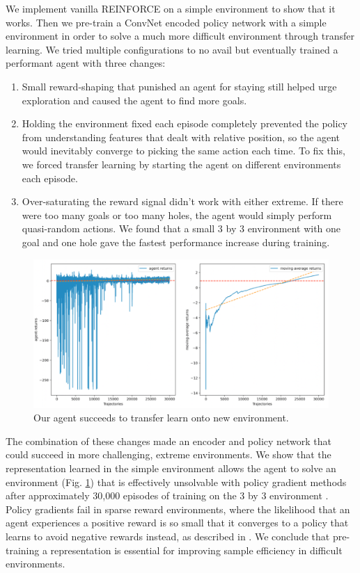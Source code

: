 \documentclass[11pt]{article}
\begin{document}
We implement vanilla REINFORCE on a simple environment to show that it works. Then we pre-train a ConvNet encoded policy network with a simple environment in order to solve a much more difficult environment through transfer learning. We tried multiple configurations to no avail but eventually trained a performant agent with three changes:
\begin{enumerate}
    \item Small reward-shaping that punished an agent for staying still helped urge exploration and caused the agent to find more goals. 
    \item Holding the environment fixed each episode completely prevented the policy from understanding features that dealt with relative position, so the agent would inevitably converge to picking the same action each time. To fix this, we forced transfer learning by starting the agent on different environments each episode. 
    \item Over-saturating the reward signal didn't work with either extreme. If there were too many goals or too many holes, the agent would simply perform quasi-random actions. We found that a small 3 by 3 environment with one goal and one hole gave the fastest performance increase during training.  
\end{enumerate} 


\begin{figure}[t]
\centering
\includegraphics[width=0.99\linewidth]{figures/fig2-successful-agent.png}
\caption{Our agent succeeds to transfer learn onto new environment.}
\label{fig:custom-env}
\end{figure}

The combination of these changes made an encoder and policy network that could succeed in more challenging, extreme environments. We show that the representation learned in the simple environment allows the agent to solve an environment (Fig. \ref{fig:custom-env}) that is effectively unsolvable with policy gradient methods after approximately 30,000 episodes of training on the 3 by 3 environment . Policy gradients fail in sparse reward environments, where the likelihood that an agent experiences a positive reward is so small that it converges to a policy that learns to avoid negative rewards instead, as described in \cite{kakade2002approximately}. We conclude that pre-training a representation is essential for improving sample efficiency in difficult environments. 
\end{document}
